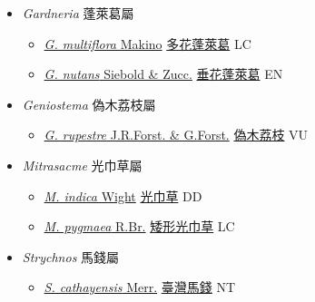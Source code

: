 
  \begin{itemize}
 \item[] \textit{Gardneria} 蓬萊葛屬
                    
  \begin{itemize}
        \item[] \href{http://www.theplantlist.org/tpl1.1/search?q=Gardneria+multiflora}{\textit{G. multiflora} Makino}   \href{\detokenize{http://taibnet.sinica.edu.tw/chi/taibnet_species_list.php?T2=多花蓬萊葛&T2_new_value=true&fr=y}}{多花蓬萊葛} LC
        \item[] \href{http://www.theplantlist.org/tpl1.1/search?q=Gardneria+nutans}{\textit{G. nutans} Siebold \& Zucc.}   \href{\detokenize{http://taibnet.sinica.edu.tw/chi/taibnet_species_list.php?T2=垂花蓬萊葛&T2_new_value=true&fr=y}}{垂花蓬萊葛} EN
  \end{itemize}
 \item[] \textit{Geniostema} 偽木荔枝屬
                    
  \begin{itemize}
        \item[] \href{http://www.theplantlist.org/tpl1.1/search?q=Geniostema+rupestre}{\textit{G. rupestre} J.R.Forst. \& G.Forst.}   \href{\detokenize{http://taibnet.sinica.edu.tw/chi/taibnet_species_list.php?T2=偽木荔枝&T2_new_value=true&fr=y}}{偽木荔枝} VU
  \end{itemize}
 \item[] \textit{Mitrasacme} 光巾草屬
                    
  \begin{itemize}
        \item[] \href{http://www.theplantlist.org/tpl1.1/search?q=Mitrasacme+indica}{\textit{M. indica} Wight}   \href{\detokenize{http://taibnet.sinica.edu.tw/chi/taibnet_species_list.php?T2=光巾草&T2_new_value=true&fr=y}}{光巾草} DD
        \item[] \href{http://www.theplantlist.org/tpl1.1/search?q=Mitrasacme+pygmaea}{\textit{M. pygmaea} R.Br.}   \href{\detokenize{http://taibnet.sinica.edu.tw/chi/taibnet_species_list.php?T2=矮形光巾草&T2_new_value=true&fr=y}}{矮形光巾草} LC
  \end{itemize}
 \item[] \textit{Strychnos} 馬錢屬
                    
  \begin{itemize}
        \item[] \href{http://www.theplantlist.org/tpl1.1/search?q=Strychnos+cathayensis}{\textit{S. cathayensis} Merr.}   \href{\detokenize{http://taibnet.sinica.edu.tw/chi/taibnet_species_list.php?T2=臺灣馬錢&T2_new_value=true&fr=y}}{臺灣馬錢} NT
  \end{itemize}
  \end{itemize}
